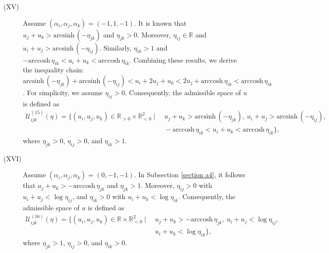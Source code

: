 \documentclass[12pt]{amsart}
\theoremstyle{definition}
\begin{document}
\begin{description}
\item[(XV)]
Assume $(\alpha_i,\alpha_j,\alpha_k)=(-1,1,-1)$.
It is known that $u_j+u_k>\mathrm{arcsinh}\, (-\eta_{jk})$ and $\eta_{jk}>0$.
Moreover, $\eta_{ij}\in \mathbb{R}$ and $u_i+u_j>\mathrm{arcsinh}\, (-\eta_{ij})$.
Similarly, $\eta_{ik}>1$ and $-\mathrm{arccosh}\, \eta_{ik}<u_i+u_k<\mathrm{arccosh}\, \eta_{ik}$.
Combining these results, we derive the inequality chain: $\mathrm{arcsinh}\, (-\eta_{jk})+\mathrm{arcsinh}\, (-\eta_{ij})<u_i+2u_j+u_k<2u_j+\mathrm{arccosh}\, \eta_{ik}<\mathrm{arccosh}\, \eta_{ik}$.
For simplicity, we assume $\eta_{ij}>0$.
Consequently, the admissible space of $u$ is defined as
\begin{equation*}
\begin{aligned}
\mathcal{U}^{(15)}_{ijk}(\eta)
=\{(u_i,u_j,u_k)\in \mathbb{R}_{>0}\times\mathbb{R}^2_{<0}
\mid &\ u_j+u_k>\mathrm{arcsinh}\, (-\eta_{jk}),\
u_i+u_j>\mathrm{arcsinh}\, (-\eta_{ij}),\ \\
&\ -\mathrm{arccosh}\, \eta_{ik}<u_i+u_k<\mathrm{arccosh}\, \eta_{ik}\},
\end{aligned}
\end{equation*}
where $\eta_{jk}>0$, $\eta_{ij}>0$, and $\eta_{ik}>1$.

\item[(XVI)]
Assume $(\alpha_i,\alpha_j,\alpha_k)=(0,-1,-1)$.
In Subsection \ref{section a4}, it follows that $u_j+u_k>-\mathrm{arccosh}\, \eta_{jk}$ and $\eta_{jk}>1$.
Moreover, $\eta_{ij}>0$ with $u_i+u_j<\log \eta_{ij}$, and $\eta_{ik}>0$ with $u_i+u_k<\log \eta_{ik}$.
Consequently, the admissible space of $u$ is defined as
\begin{equation*}
\begin{aligned}
\mathcal{U}^{(16)}_{ijk}(\eta)
=\{(u_i,u_j,u_k)\in \mathbb{R}\times\mathbb{R}^2_{<0}
\mid &\ u_j+u_k>-\mathrm{arccosh}\, \eta_{jk},\
u_i+u_j<\log \eta_{ij},\ \\
&\ u_i+u_k<\log \eta_{ik}\},
\end{aligned}
\end{equation*}
where $\eta_{jk}>1$, $\eta_{ij}>0$, and $\eta_{ik}>0$.


\end{description}
\end{document}
